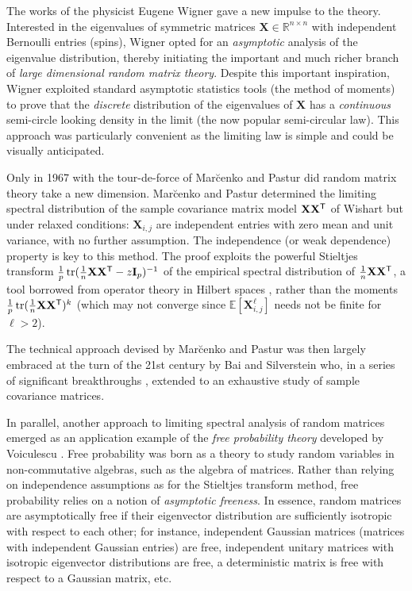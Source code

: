 \documentclass[MAL,biber]{nowfnt} %
\newcommand{\T}{{\sf T}}
\DeclareMathOperator{\tr}{tr}
\newcommand{\I}{{\mathbf{I}}}
\newcommand{\X}{{\mathbf{X}}}
\newcommand{\RR}{{\mathbb{R}}}
\newcommand{\EE}{{\mathbb{E}}}
\begin{document}
The works of the physicist Eugene Wigner \citep{wigner1955characteristic} gave a new impulse to the theory. Interested in the eigenvalues of symmetric matrices $\X\in\RR^{n\times n}$ with independent Bernoulli entries (spins), Wigner opted for an \emph{asymptotic} analysis of the eigenvalue distribution, thereby initiating the important and much richer branch of \emph{large dimensional random matrix theory}. Despite this important inspiration, Wigner exploited standard asymptotic statistics tools (the method of moments) to prove that the \emph{discrete} distribution of the eigenvalues of $\X$ has a \emph{continuous} semi-circle looking density in the limit (the now popular semi-circular law). This approach was particularly convenient as the limiting law is simple and could be visually anticipated. 

Only in 1967 with the tour-de-force of Mar\u{c}enko and Pastur \citep{marvcenko1967distribution} did random matrix theory take a new dimension. Mar\u{c}enko and Pastur determined the limiting spectral distribution of the sample covariance matrix model $\X\X^\T$ of Wishart but under relaxed conditions: $\X_{i,j}$ are independent entries with zero mean and unit variance, with no further assumption. The independence (or weak dependence) property is key to this method. The proof exploits the powerful Stieltjes transform $\frac1p\tr(\frac1n\X\X^\T-z\I_p)^{-1}$ of the empirical spectral distribution of $\frac1n\X\X^\T$, a tool borrowed from operator theory in Hilbert spaces \citep{akhiezer2013theory}, rather than the moments $\frac1p\tr (\frac1n\X\X^\T)^k$ (which may not converge since $\EE[\X_{i,j}^\ell]$ needs not be finite for $\ell>2$). 

The technical approach devised by Mar\u{c}enko and Pastur was then largely embraced at the turn of the 21st century by Bai and Silverstein who, in a series of significant breakthroughs \citep{silverstein1995empirical,bai1998no}, extended \citep{marvcenko1967distribution} to an exhaustive study of sample covariance matrices.

In parallel, another approach to limiting spectral analysis of random matrices emerged as an application example of the \emph{free probability theory} developed by Voiculescu \citep{voiculescu1992free}. Free probability was born as a theory to study random variables in non-commutative algebras, such as the algebra of matrices. Rather than relying on independence assumptions as for the Stieltjes transform method, free probability relies on a notion of \emph{asymptotic freeness}. In essence, random matrices are asymptotically free if their eigenvector distribution are sufficiently isotropic with respect to each other; for instance, independent Gaussian matrices (matrices with independent Gaussian entries) are free, independent unitary matrices with isotropic eigenvector distributions are free, a deterministic matrix is free with respect to a Gaussian matrix, etc. 
\end{document}
